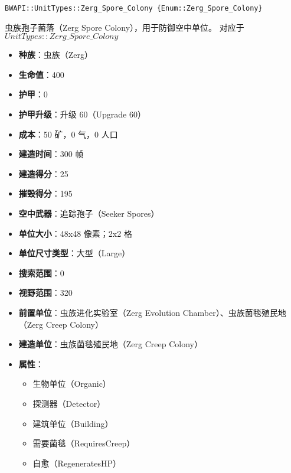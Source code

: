 \begin{tcolorbox}[colback=white, colframe=black!60!white, title=Zerg\_Spore\_Colony(), arc=0mm]
    \begin{verbatim}
BWAPI::UnitTypes::Zerg_Spore_Colony {Enum::Zerg_Spore_Colony}
    \end{verbatim}
    虫族孢子菌落（Zerg Spore Colony），用于防御空中单位。
    对应于  $UnitTypes::Zerg\_Spore\_Colony$ 
    \begin{itemize}
        \item \textbf{种族}：虫族（Zerg）
        \item \textbf{生命值}：400
        \item \textbf{护甲}：0
        \item \textbf{护甲升级}：升级 60（Upgrade 60）
        \item \textbf{成本}：50 矿，0 气，0 人口
        \item \textbf{建造时间}：300 帧
        \item \textbf{建造得分}：25
        \item \textbf{摧毁得分}：195
        \item \textbf{空中武器}：追踪孢子（Seeker Spores）
        \item \textbf{单位大小}：48x48 像素；2x2 格
        \item \textbf{单位尺寸类型}：大型（Large）
        \item \textbf{搜索范围}：0
        \item \textbf{视野范围}：320
        \item \textbf{前置单位}：虫族进化实验室（Zerg Evolution Chamber）、虫族菌毯殖民地（Zerg Creep Colony）
        \item \textbf{建造单位}：虫族菌毯殖民地（Zerg Creep Colony）
        \item \textbf{属性}：
            \begin{itemize}
                \item 生物单位（Organic）
                \item 探测器（Detector）
                \item 建筑单位（Building）
                \item 需要菌毯（RequiresCreep）
                \item 自愈（RegeneratesHP）
            \end{itemize}
    \end{itemize}
\end{tcolorbox}

